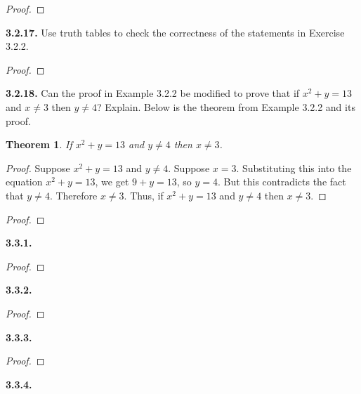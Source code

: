 \documentclass[12pt]{amsart}
\newenvironment{statement}[1]{\smallskip\noindent\color[rgb]{.6627, .3529, .6314} {\bf #1.}}{}
\newtheorem{theorem}{Theorem}
\theoremstyle{definition}
\theoremstyle{remark}
\begin{document}
\begin{proof}
\end{proof}


\begin{statement}{3.2.17}
Use truth tables to check the correctness of the statements in Exercise 3.2.2.
\end{statement}

\begin{proof}
\end{proof}


\begin{statement}{3.2.18}
Can the proof in Example 3.2.2 be modified to prove that if $x^2 + y = 13$ and $x \neq 3$ then $y \neq 4$?
Explain.
Below is the theorem from Example 3.2.2 and its proof.
\begin{theorem}
	If $x^2 + y = 13$ and $y \neq 4$ then $x \neq 3$.
\end{theorem}
\begin{proof}
	Suppose $x^2 + y = 13$ and $y \neq 4$.
	Suppose $x = 3$.
	Substituting this into the equation $x^2 + y = 13$, we get $9 + y = 13$, so $y = 4$.
	But this contradicts the fact that $y \neq 4$.
	Therefore $x \neq 3$.
	Thus, if $x^2 + y = 13$ and $y \neq 4$ then $x \neq 3$.
\end{proof}
\end{statement}

\begin{proof}
\end{proof}


\begin{statement}{3.3.1}
\end{statement}

\begin{proof}
\end{proof}


\begin{statement}{3.3.2}
\end{statement}

\begin{proof}
\end{proof}


\begin{statement}{3.3.3}
\end{statement}

\begin{proof}
\end{proof}


\begin{statement}{3.3.4}
\end{statement}
\end{document}
